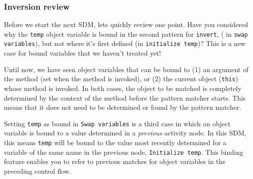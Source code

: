 \newpage
\subsubsection{Inversion review}
\genHeader
\hypertarget{invert close}{}

Before we start the next SDM, lets quickly review one point. Have you considered why the \texttt{temp} object variable is bound in the second pattern for
\texttt{invert}, ( in \texttt{swap variables}), but not where it's first defined (in \texttt{initialize temp})? This is a new case for bound variables that we
haven't treated yet!

Until now, we have seen object variables that can be bound to (1) an argument of the method (set when the method is invoked), or (2) the
current object (\texttt{this}) whose method is invoked. In both cases, the object to be matched is completely determined by the context of the method before
the pattern matcher starts. This means that it does not need to be determined or found by the pattern matcher.

Setting \texttt{temp} as bound in \texttt{Swap variables} is a third case in which an object variable is bound to a value determined in a \emph{previous}
activity node. In this SDM, this means \texttt{temp} will be bound to the value most recently determined for a variable of the same name in the previous node,
\texttt{Initialize temp}. This binding feature enables you to refer to previous matches for object variables in the preceding control flow. 
